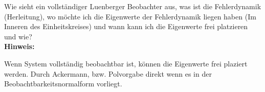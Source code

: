 \begin{question}[section=8,name={Luenberger Beobachter 1},difficulty=,type=mdl,tags={}]
	Wie sieht ein vollständiger Luenberger Beobachter aus, was ist die Fehlerdynamik (Herleitung), wo möchte ich die Eigenwerte der Fehlerdynamik liegen haben (Im Inneren des Einheitskreises) und wann kann ich die Eigenwerte frei platzieren und wie?
	\\ \textbf{Hinweis:}\\
	
\end{question}
\begin{solution}
	Wenn System vollständig beobachtbar ist, können die Eigenwerte frei plaziert werden. Durch Ackermann, bzw. Polvorgabe direkt wenn es in der Beobachtbarkeitsnormalform vorliegt.
\end{solution}